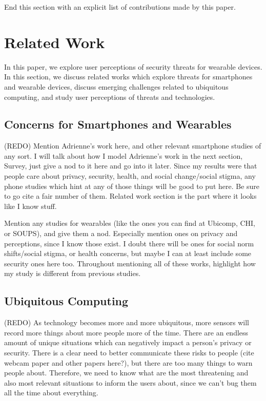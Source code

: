 \documentclass{acm_proc_article-sp}
\begin{document}
End this section with an explicit list of contributions made by this paper.


\section{Related Work}
In this paper, we explore user perceptions of security threats for wearable devices. In this section, we discuss related works which explore threats for smartphones and wearable devices, discuss emerging challenges related to ubiquitous computing, and study user perceptions of threats and technologies. 

\subsection{Concerns for Smartphones and Wearables}
(REDO) Mention Adrienne's work here, and other relevant smartphone studies of any sort. I will talk about how I model Adrienne's work in the next section, Survey, just give a nod to it here and go into it later. Since my results were that people care about privacy, security, health, and social change/social stigma, any phone studies which hint at any of those things will be good to put here. Be sure to go cite a fair number of them. Related work section is the part where it looks like I know stuff. 

Mention any studies for wearables (like the ones you can find at Ubicomp, CHI, or SOUPS), and give them a nod. Especially mention ones on privacy and perceptions, since I know those exist. I doubt there will be ones for social norm shifts/social stigma, or health concerns, but maybe I can at least include some security ones here too. Throughout mentioning all of these works, highlight how my study is different from previous studies. 

\subsection{Ubiquitous Computing}
(REDO) As technology becomes more and more ubiquitous, more sensors will record more things about more people more of the time. There are an endless amount of unique situations which can negatively impact a person's privacy or security. There is a clear need to better communicate these risks to people (cite webcam paper and other papers here?), but there are too many things to warn people about. Therefore, we need to know what are the most threatening and also most relevant situations to inform the users about, since we can't bug them all the time about everything. 
\end{document}
